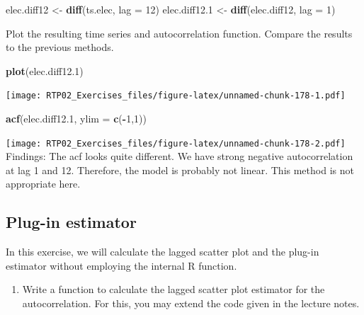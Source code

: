 \documentclass[
]{article}
\newenvironment{Shaded}{\begin{snugshade}}{\end{snugshade}}
\newcommand{\DataTypeTok}[1]{\textcolor[rgb]{0.13,0.29,0.53}{#1}}
\newcommand{\DecValTok}[1]{\textcolor[rgb]{0.00,0.00,0.81}{#1}}
\newcommand{\FloatTok}[1]{\textcolor[rgb]{0.00,0.00,0.81}{#1}}
\newcommand{\KeywordTok}[1]{\textcolor[rgb]{0.13,0.29,0.53}{\textbf{#1}}}
\newcommand{\NormalTok}[1]{#1}
\newcommand{\OperatorTok}[1]{\textcolor[rgb]{0.81,0.36,0.00}{\textbf{#1}}}
\newcommand{\StringTok}[1]{\textcolor[rgb]{0.31,0.60,0.02}{#1}}
\providecommand{\tightlist}{%
  \setlength{\itemsep}{0pt}\setlength{\parskip}{0pt}}
\begin{document}
\begin{Shaded}
\begin{Highlighting}[]
\NormalTok{elec.diff12 <-}\StringTok{ }\KeywordTok{diff}\NormalTok{(ts.elec, }\DataTypeTok{lag =} \DecValTok{12}\NormalTok{)}
\NormalTok{elec.diff12}\FloatTok{.1}\NormalTok{ <-}\StringTok{ }\KeywordTok{diff}\NormalTok{(elec.diff12, }\DataTypeTok{lag =} \DecValTok{1}\NormalTok{)}
\end{Highlighting}
\end{Shaded}

Plot the resulting time series and autocorrelation function. Compare the
results to the previous methods.

\begin{Shaded}
\begin{Highlighting}[]
\KeywordTok{plot}\NormalTok{(elec.diff12}\FloatTok{.1}\NormalTok{)}
\end{Highlighting}
\end{Shaded}

\texttt{[image: RTP02\_Exercises\_files/figure-latex/unnamed-chunk-178-1.pdf]}

\begin{Shaded}
\begin{Highlighting}[]
\KeywordTok{acf}\NormalTok{(elec.diff12}\FloatTok{.1}\NormalTok{, }\DataTypeTok{ylim =} \KeywordTok{c}\NormalTok{(}\OperatorTok{-}\DecValTok{1}\NormalTok{,}\DecValTok{1}\NormalTok{))}
\end{Highlighting}
\end{Shaded}

\texttt{[image: RTP02\_Exercises\_files/figure-latex/unnamed-chunk-178-2.pdf]}
Findings: The acf looks quite different. We have strong negative
autocorrelation at lag 1 and 12. Therefore, the model is probably not
linear. This method is not appropriate here.

\hypertarget{plug-in-estimator-1}{%
\subsection{Plug-in estimator}\label{plug-in-estimator-1}}

In this exercise, we will calculate the lagged scatter plot and the
plug-in estimator without employing the internal R function.

\begin{enumerate}
\def\labelenumi{\alph{enumi})}
\tightlist
\item
  Write a function to calculate the lagged scatter plot estimator for
  the autocorrelation. For this, you may extend the code given in the
  lecture notes.
\end{enumerate}
\end{document}
